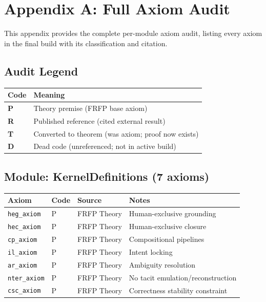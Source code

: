 \section{Appendix A: Full Axiom Audit}
\label{app:axiom_audit}

This appendix provides the complete per-module axiom audit, listing every axiom
in the final build with its classification and citation.

\subsection*{Audit Legend}

\begin{center}
\begin{tabular}{ll}
\toprule
Code & Meaning \\
\midrule
\textbf{P} & Theory premise (FRFP base axiom) \\
\textbf{R} & Published reference (cited external result) \\
\textbf{T} & Converted to theorem (was axiom; proof now exists) \\
\textbf{D} & Dead code (unreferenced; not in active build) \\
\bottomrule
\end{tabular}
\end{center}

\subsection*{Module: KernelDefinitions (7 axioms)}

\begin{center}
\begin{tabular}{lllp{5cm}}
\toprule
Axiom & Code & Source & Notes \\
\midrule
\texttt{heg\_axiom} & P & FRFP Theory & Human-exclusive grounding \\
\texttt{hec\_axiom} & P & FRFP Theory & Human-exclusive closure \\
\texttt{cp\_axiom} & P & FRFP Theory & Compositional pipelines \\
\texttt{il\_axiom} & P & FRFP Theory & Intent locking \\
\texttt{ar\_axiom} & P & FRFP Theory & Ambiguity resolution \\
\texttt{nter\_axiom} & P & FRFP Theory & No tacit emulation/reconstruction \\
\texttt{csc\_axiom} & P & FRFP Theory & Correctness stability constraint \\
\bottomrule
\end{tabular}
\end{center}

